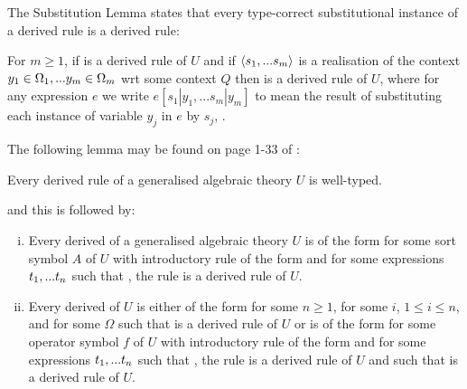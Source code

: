 The Substitution Lemma states that every type-correct substitutional instance of a derived rule is a derived rule:
\begin{lemma}
For $m \geq 1$, if  is a derived rule of $U$
and  if $\langle s_1,...s_{m}\rangle$ is a realisation of the context $y_1 \in \Omega_1,... y_{m} \in \Omega_{m}$ wrt some context $Q$ 
then  is a derived rule of $U$, where
for any expression $e$ we write
$e[s_1|y_1,...s_m|y_m]$ to mean
the result of substituting each instance of variable $y_j$ in $e$ by $s_j$, \foreachj.
\end{lemma}

The following lemma may be found on page 1-33 of \cite{Cartmell78}:
\begin{lemma}
Every derived rule of a generalised algebraic theory $U$ is well-typed.
\end{lemma} 
\noindent and this is followed by:
\begin{lemma}
\begin{enumerate}[(i)]
\item Every derived \Trule of a generalised algebraic theory $U$ is of the form
 for some sort symbol $A$ of $U$ with introductory rule of the form
 and for some expressions $t_1,...t_n$ such that \foreachi, the rule
 is a derived rule of $U$.
\item Every derived \trule of $U$ is 
either of the form  for some $n \ge 1$, for some $i$, $1 \leq i \leq n$, 
and for some $\Omega$ such that  is a derived rule of $U$
or is of the form
 for some operator symbol $f$ of $U$ 
with introductory rule of the form
and for some expressions $t_1,...t_n$ such that \foreachi, the rule
 is a derived rule of $U$
and such that
 is a derived rule of $U$.
\end{enumerate}
\end{lemma}

